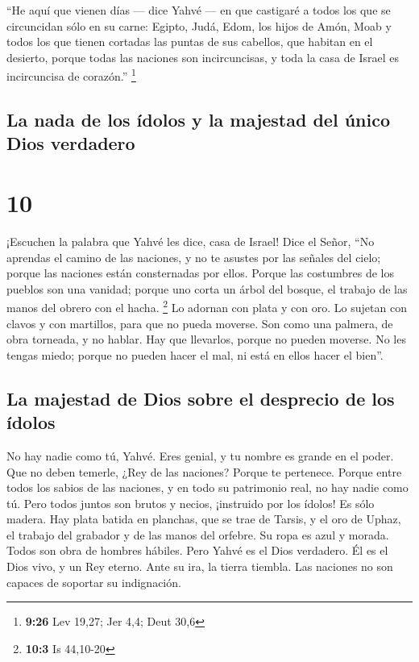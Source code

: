  ``He aquí que vienen días --- dice Yahvé --- en que
castigaré a todos los que se circuncidan sólo en su carne:
 Egipto, Judá, Edom, los hijos de Amón, Moab y todos los
que tienen cortadas las puntas de sus cabellos, que habitan en el
desierto, porque todas las naciones son incircuncisas, y toda la casa de
Israel es incircuncisa de corazón.'' \footnote{\textbf{9:26} Lev 19,27;
  Jer 4,4; Deut 30,6}

\hypertarget{la-nada-de-los-uxeddolos-y-la-majestad-del-uxfanico-dios-verdadero}{%
\subsection{La nada de los ídolos y la majestad del único Dios
verdadero}\label{la-nada-de-los-uxeddolos-y-la-majestad-del-uxfanico-dios-verdadero}}

\hypertarget{section-9}{%
\section{10}\label{section-9}}

 ¡Escuchen la palabra que Yahvé les dice, casa de Israel!
 Dice el Señor, ``No aprendas el camino de las naciones, y
no te asustes por las señales del cielo; porque las naciones están
consternadas por ellos.  Porque las costumbres de los
pueblos son una vanidad; porque uno corta un árbol del bosque, el
trabajo de las manos del obrero con el hacha. \footnote{\textbf{10:3} Is
  44,10-20}  Lo adornan con plata y con oro. Lo sujetan
con clavos y con martillos, para que no pueda moverse. 
Son como una palmera, de obra torneada, y no hablar. Hay que llevarlos,
porque no pueden moverse. No les tengas miedo; porque no pueden hacer el
mal, ni está en ellos hacer el bien''.

\hypertarget{la-majestad-de-dios-sobre-el-desprecio-de-los-uxeddolos}{%
\subsection{La majestad de Dios sobre el desprecio de los
ídolos}\label{la-majestad-de-dios-sobre-el-desprecio-de-los-uxeddolos}}

 No hay nadie como tú, Yahvé. Eres genial, y tu nombre es
grande en el poder.  Que no deben temerle, ¿Rey de las
naciones? Porque te pertenece. Porque entre todos los sabios de las
naciones, y en todo su patrimonio real, no hay nadie como tú.
 Pero todos juntos son brutos y necios, ¡instruido por los
ídolos! Es sólo madera.  Hay plata batida en planchas, que
se trae de Tarsis, y el oro de Uphaz, el trabajo del grabador y de las
manos del orfebre. Su ropa es azul y morada. Todos son obra de hombres
hábiles.  Pero Yahvé es el Dios verdadero. Él es el Dios
vivo, y un Rey eterno. Ante su ira, la tierra tiembla. Las naciones no
son capaces de soportar su indignación.

